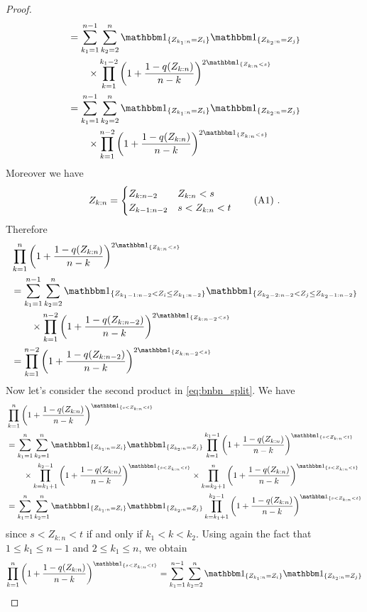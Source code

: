 \begin{lemma}
\begin{proof}
\begin{align*}
		&= \sum_{k_1=1}^{n-1}\sum_{k_2=2}^{n} \I{Z_{k_1:n}=Z_i}\I{Z_{k_2:n}=Z_j}\\
		&\qquad \times \prod_{k=1}^{k_1-2}\left(1+\frac{1-q(Z_{k:n})}{n-k}\right)^{2\I{Z_{k:n}<s}}\\
		&= \sum_{k_1=1}^{n-1}\sum_{k_2=2}^{n} \I{Z_{k_1:n}=Z_i}\I{Z_{k_2:n}=Z_j}\\
		&\qquad \times \prod_{k=1}^{n-2}\left(1+\frac{1-q(Z_{k:n})}{n-k}\right)^{2\I{Z_{k:n}<s}}
		\end{align*}
		Moreover we have 
		\[ Z_{k:n} = \begin{cases} 
		Z_{k:n-2} & Z_{k:n} < s  \\
		Z_{k-1:n-2} & s < Z_{k:n} < t
		\end{cases}\numberthis\label{eq:zkn_zknminustwo}\mdot
		\]
		Therefore 
		\begin{align*}
		&\prod_{k=1}^{n}\left(1+\frac{1-q(Z_{k:n})}{n-k}\right)^{2\I{Z_{k:n}<s}}\\
		&= \sum_{k_1=1}^{n-1}\sum_{k_2=2}^{n} \I{Z_{k_1-1:n-2} < Z_i \leq Z_{k_1:n-2}}\I{Z_{k_2-2:n-2} < Z_j \leq Z_{k_2-1:n-2}}\\
		&\qquad \times \prod_{k=1}^{n-2}\left(1+\frac{1-q(Z_{k:n-2})}{n-k}\right)^{2\I{Z_{k:n-2}<s}}\\
		&= \prod_{k=1}^{n-2}\left(1+\frac{1-q(Z_{k:n-2})}{n-k}\right)^{2\I{Z_{k:n-2}<s}}\\
		\end{align*}
		Now let's consider the second product in \eqref{eq:bnbn_split}. We have
		\begin{align*}
		&\prod_{k=1}^{n}\left(1+\frac{1-q(Z_{k:n})}{n-k}\right)^{\I{s<Z_{k:n}<t}}\\
		&= \sum_{k_1=1}^{n}\sum_{k_2=1}^{n} \I{Z_{k_1:n}=Z_i}\I{Z_{k_2:n}=Z_j} \prod_{k=1}^{k_1-1}\left(1+\frac{1-q(Z_{k:n})}{n-k}\right)^{\I{s<Z_{k:n}<t}}\\
		&\qquad \times \prod_{k=k_1+1}^{k_2-1}\left(1+\frac{1-q(Z_{k:n})}{n-k}\right)^{\I{s<Z_{k:n}<t}} \times \prod_{k=k_2+1}^{n}\left(1+\frac{1-q(Z_{k:n})}{n-k}\right)^{\I{s<Z_{k:n}<t}}\\
		&= \sum_{k_1=1}^{n}\sum_{k_2=1}^{n} \I{Z_{k_1:n}=Z_i}\I{Z_{k_2:n}=Z_j}  \prod_{k=k_1+1}^{k_2-1}\left(1+\frac{1-q(Z_{k:n})}{n-k}\right)^{\I{s<Z_{k:n}<t}}
		\end{align*}
		since $s < Z_{k:n} < t$ if and only if $k_1<k<k_2$. Using again the fact that $1 \leq k_1 \leq n-1$ and $2 \leq k_1 \leq n$, we obtain
		\begin{align*}
		\prod_{k=1}^{n}\left(1+\frac{1-q(Z_{k:n})}{n-k}\right)^{\I{s<Z_{k:n}<t}} &= \sum_{k_1=1}^{n-1}\sum_{k_2=2}^{n} \I{Z_{k_1:n}=Z_i}\I{Z_{k_2:n}=Z_j}\\

\end{align*}
\end{proof}
\end{lemma}
